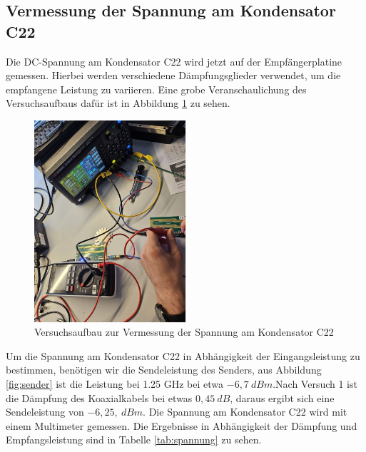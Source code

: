 \subsection{Vermessung der Spannung am Kondensator C22}
Die DC-Spannung am Kondensator C22 wird jetzt auf der Empfängerplatine gemessen. Hierbei werden verschiedene Dämpfungsglieder verwendet, um die empfangene Leistung zu variieren. Eine grobe Veranschaulichung des Versuchsaufbaus dafür ist in Abbildung \ref{fig:versuchsaufbau2} zu sehen.
\begin{figure}[H]
    \centering
    \includegraphics[width=0.5\textwidth]{Pictures/VesuchsaufbauSpannung.jpg}
    \caption{Versuchsaufbau zur Vermessung der Spannung am Kondensator C22}
    \label{fig:versuchsaufbau2}
\end{figure}
Um die Spannung am Kondensator C22 in Abhängigkeit der Eingangsleistung zu bestimmen, benötigen wir die Sendeleistung des Senders,
aus Abbildung \ref{fig:sender} ist die Leistung bei 1.25 GHz bei etwa $-6,7~dBm$.Nach Versuch 1 ist die Dämpfung des Koaxialkabels
bei etwas $0,45~dB$, daraus ergibt sich eine Sendeleistung von $-6,25,~dBm$.
Die Spannung am Kondensator C22 wird mit einem Multimeter gemessen. Die Ergebnisse in Abhängigkeit der Dämpfung und Empfangsleistung sind in Tabelle \ref{tab:spannung} zu sehen.
